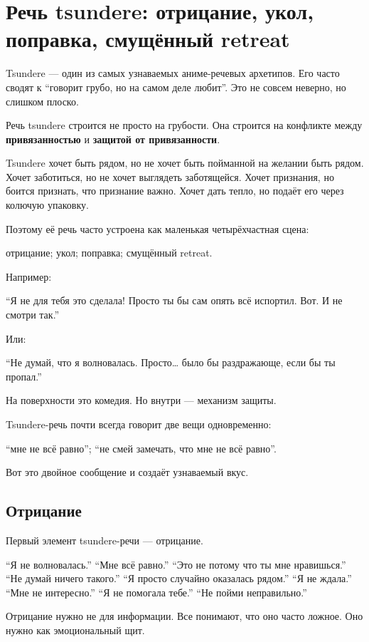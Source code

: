 \section{Речь tsundere: отрицание, укол, поправка, смущённый retreat}

Tsundere --- один из самых узнаваемых аниме-речевых архетипов. Его часто
сводят к ``говорит грубо, но на самом деле любит''. Это не совсем
неверно, но слишком плоско.

Речь tsundere строится не просто на грубости. Она строится на конфликте
между \textbf{привязанностью} и \textbf{защитой от привязанности}.

Tsundere хочет быть рядом, но не хочет быть пойманной на желании быть
рядом. Хочет заботиться, но не хочет выглядеть заботящейся. Хочет
признания, но боится признать, что признание важно. Хочет дать тепло, но
подаёт его через колючую упаковку.

Поэтому её речь часто устроена как маленькая четырёхчастная сцена:

отрицание; укол; поправка; смущённый retreat.

Например:

``Я не для тебя это сделала! Просто ты бы сам опять всё испортил. Вот. И
не смотри так.''

Или:

``Не думай, что я волновалась. Просто\ldots{} было бы раздражающе, если
бы ты пропал.''

На поверхности это комедия. Но внутри --- механизм защиты.

Tsundere-речь почти всегда говорит две вещи одновременно:

``мне не всё равно''; ``не смей замечать, что мне не всё равно''.

Вот это двойное сообщение и создаёт узнаваемый вкус.

\subsection*{Отрицание}

Первый элемент tsundere-речи --- отрицание.

``Я не волновалась.'' ``Мне всё равно.'' ``Это не потому что ты мне
нравишься.'' ``Не думай ничего такого.'' ``Я просто случайно оказалась
рядом.'' ``Я не ждала.'' ``Мне не интересно.'' ``Я не помогала тебе.''
``Не пойми неправильно.''

Отрицание нужно не для информации. Все понимают, что оно часто ложное.
Оно нужно как эмоциональный щит.

